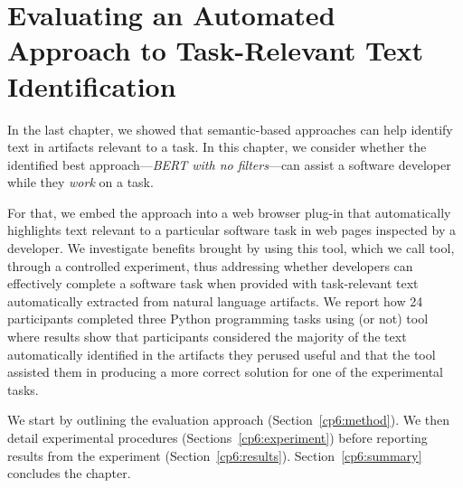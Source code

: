 \setcounter{chapter}{5}


\chapter{Evaluating an Automated Approach to Task-Relevant Text Identification}
\label{ch:assisting}


In the last chapter, we showed that semantic-based approaches can help identify text in artifacts relevant to a task. 
In this chapter, we consider whether the identified best approach---\textit{BERT with no filters}---can assist a software developer while they \textit{work} on a task.





For that, we embed the approach into a web browser plug-in that automatically highlights 
text relevant to a particular software task in web pages inspected by a developer.
We investigate benefits brought by using this tool, which we call \acs{tool}, through a controlled experiment,
thus addressing whether developers can effectively complete a software task 
when provided with task-relevant text automatically extracted from natural language artifacts. 
We report how  24 participants completed three Python programming tasks using (or not) \acs{tool}
where results show that participants considered the majority of the text automatically identified in the artifacts 
they perused useful and that 
the tool assisted them in producing a more correct solution for one of the experimental tasks.



We start by outlining the evaluation approach  (Section~\ref{cp6:method}). We then
detail experimental procedures  (Sections~\ref{cp6:experiment}) before reporting
results from the experiment 
(Section~\ref{cp6:results}).
Section~\ref{cp6:summary} concludes the chapter.





